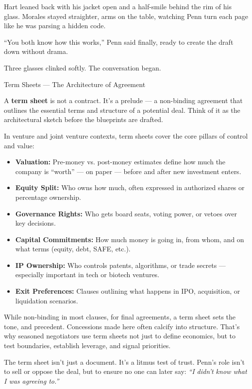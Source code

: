 Hart leaned back with his jacket open and a half-smile behind the rim of his glass.
Morales stayed straighter, arms on the table, watching Penn turn each page like he was parsing a hidden code.

``You both know how this works,'' Penn said finally, ready to create the draft down without drama. 

Three glasses clinked softly.
The conversation began.

\medskip

\begin{TechnicalSidebar}{Term Sheets — The Architecture of Agreement}

  A \textbf{term sheet} is not a contract. It’s a prelude — a non-binding agreement that outlines the essential terms 
  and structure of a potential deal. Think of it as the architectural sketch before the blueprints are drafted.
  
  \medskip
  
  In venture and joint venture contexts, term sheets cover the core pillars of control and value:

  \medskip
  
  \begin{itemize}
    \item \textbf{Valuation:} Pre-money vs. post-money estimates define how much the company is “worth” — on paper — 
    before and after new investment enters.
    \item \textbf{Equity Split:} Who owns how much, often expressed in authorized shares or percentage ownership.
    \item \textbf{Governance Rights:} Who gets board seats, voting power, or vetoes over key decisions.
    \item \textbf{Capital Commitments:} How much money is going in, from whom, and on what terms (equity, debt, SAFE, etc.).
    \item \textbf{IP Ownership:} Who controls patents, algorithms, or trade secrets — especially important in tech or 
    biotech ventures.
    \item \textbf{Exit Preferences:} Clauses outlining what happens in IPO, acquisition, or liquidation scenarios.
  \end{itemize}
  
  \medskip
  
  While non-binding in most clauses, for final agreements, a term sheet sets the tone, and precedent. Concessions made 
  here often calcify into structure. That’s why seasoned negotiators use term sheets not just to define economics, but to 
  test boundaries, establish leverage, and signal priorities.
  
  \medskip
  
  The term sheet isn’t just a document. It’s a litmus test of trust. Penn’s role isn’t to sell 
  or oppose the deal, but to ensure no one can later say: \textit{``I didn’t know what I was agreeing to.''}
  
\end{TechnicalSidebar}

